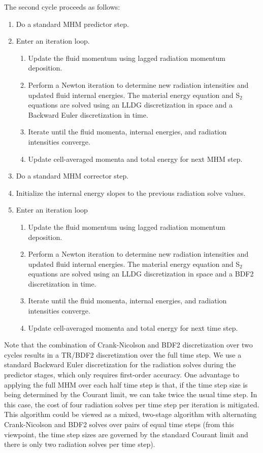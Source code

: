\documentclass[preprint,12pt]{elsarticle}
\begin{document}
The second cycle proceeds as follows:
\begin{enumerate}
  \item Do a standard MHM predictor step. 
  \item Enter an iteration loop.
  \begin{enumerate}
    \item Update the fluid momentum using lagged radiation momentum deposition.
    \item Perform a Newton iteration to determine new radiation intensities and updated fluid internal energies.  The material energy equation
          and S$_2$ equations are solved using an LLDG discretization in space and a Backward Euler discretization in time.
    \item Iterate until the fluid momenta, internal energies, and radiation intensities converge.
    \item Update cell-averaged momenta and total energy for next MHM step.
  \end{enumerate}
  \item Do a standard MHM corrector step.
  \item Initialize the internal energy slopes to the previous radiation solve values.
  \item Enter an iteration loop
  \begin{enumerate}
  \item Update the fluid momentum using lagged radiation momentum deposition.
    \item Perform a Newton iteration to determine new radiation intensities and updated fluid internal energies.  The material energy equation
          and S$_2$ equations are solved using an LLDG discretization in space and a BDF2 discretization in time.
  \item Iterate until the fluid momenta, internal energies, and radiation intensities converge.
    \item Update cell-averaged momenta and total energy for next time step.
  \end{enumerate}
\end{enumerate}
Note that the combination of Crank-Nicolson and BDF2 discretization over two cycles results in
a TR/BDF2 discretization over the full time step.  We use a standard Backward
Euler discretization for the radiation solves during the predictor stages,
which only requires first-order accuracy.  One advantage to applying the full
MHM over each half time step is that, if the time step size is being determined
by the Courant limit, we can take twice the usual time step.  In this case, the
cost of four radiation solves per time step per iteration is mitigated.
This algorithm could be viewed as a mixed, two-stage algorithm
with alternating Crank-Nicolson and BDF2 solves over pairs of equal time steps (from this
viewpoint, the time step sizes are governed by the standard Courant limit and
there is only two radiation solves per time step).  
\end{document}
